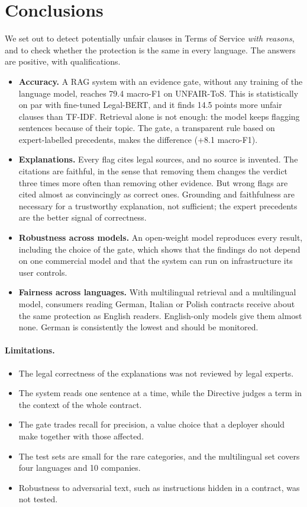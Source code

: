\section{Conclusions}
\label{sec:conclusion}

We set out to detect potentially unfair clauses in Terms of Service \emph{with reasons}, and to check whether the protection is the same in every language. The answers are positive, with qualifications.

\begin{itemize}
  \item \textbf{Accuracy.} A RAG system with an evidence gate, without any training of the language model, reaches 79.4 macro-F1 on UNFAIR-ToS. This is statistically on par with fine-tuned Legal-BERT, and it finds 14.5 points more unfair clauses than TF-IDF. Retrieval alone is not enough: the model keeps flagging sentences because of their topic. The gate, a transparent rule based on expert-labelled precedents, makes the difference (+8.1 macro-F1).
  \item \textbf{Explanations.} Every flag cites legal sources, and no source is invented. The citations are faithful, in the sense that removing them changes the verdict three times more often than removing other evidence. But wrong flags are cited almost as convincingly as correct ones. Grounding and faithfulness are necessary for a trustworthy explanation, not sufficient; the expert precedents are the better signal of correctness.
  \item \textbf{Robustness across models.} An open-weight model reproduces every result, including the choice of the gate, which shows that the findings do not depend on one commercial model and that the system can run on infrastructure its user controls.
  \item \textbf{Fairness across languages.} With multilingual retrieval and a multilingual model, consumers reading German, Italian or Polish contracts receive about the same protection as English readers. English-only models give them almost none. German is consistently the lowest and should be monitored.
\end{itemize}

\paragraph{Limitations.}
\begin{itemize}
  \item The legal correctness of the explanations was not reviewed by legal experts.
  \item The system reads one sentence at a time, while the Directive judges a term in the context of the whole contract.
  \item The gate trades recall for precision, a value choice that a deployer should make together with those affected.
  \item The test sets are small for the rare categories, and the multilingual set covers four languages and 10 companies.
  \item Robustness to adversarial text, such as instructions hidden in a contract, was not tested.
\end{itemize}

